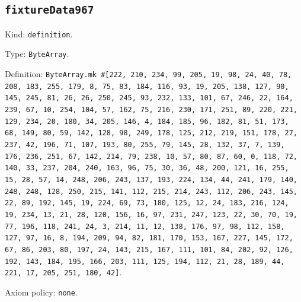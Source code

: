 \documentclass[11pt]{article}
\begin{document}
\subsection*{\texttt{fixtureData967}}
\noindent Kind: \texttt{definition}.\par
\noindent Type: \texttt{ByteArray}.\par
\noindent Definition: \texttt{ByteArray.mk \#[222, 210, 234, 99, 205, 19, 98, 24, 40, 78, 208, 183, 255, 179, 8, 75, 83, 184, 116, 93, 19, 205, 138, 127, 90, 145, 245, 81, 26, 26, 250, 245, 93, 232, 133, 101, 67, 246, 22, 164, 239, 67, 10, 254, 104, 57, 162, 75, 216, 230, 171, 251, 89, 220, 221, 129, 234, 20, 180, 34, 205, 146, 4, 184, 185, 96, 182, 81, 51, 173, 68, 149, 80, 59, 142, 128, 98, 249, 178, 125, 212, 219, 151, 178, 27, 237, 42, 196, 71, 107, 193, 80, 255, 79, 145, 28, 132, 37, 7, 139, 176, 236, 251, 67, 142, 214, 79, 238, 10, 57, 80, 87, 60, 0, 118, 72, 140, 33, 237, 204, 240, 163, 96, 75, 30, 36, 48, 200, 121, 16, 255, 15, 28, 57, 14, 248, 206, 243, 137, 193, 224, 134, 44, 241, 179, 140, 248, 248, 128, 250, 215, 141, 112, 215, 214, 243, 112, 206, 243, 145, 22, 89, 192, 145, 19, 224, 69, 73, 180, 125, 12, 24, 183, 216, 124, 19, 234, 13, 21, 28, 120, 156, 16, 97, 231, 247, 123, 22, 30, 70, 19, 77, 196, 118, 241, 24, 3, 214, 11, 12, 138, 176, 97, 98, 112, 158, 127, 97, 16, 8, 194, 209, 94, 82, 181, 170, 153, 167, 227, 145, 172, 67, 86, 203, 80, 197, 24, 143, 215, 167, 111, 101, 84, 202, 92, 126, 192, 143, 184, 195, 166, 203, 111, 125, 194, 112, 21, 28, 189, 44, 221, 17, 205, 251, 180, 42]}.\par
\noindent Axiom policy: \texttt{none}.\par
\end{document}
